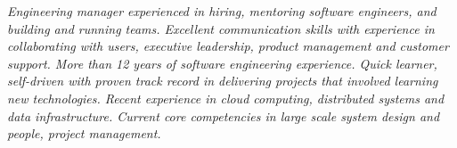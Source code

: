 {\selectfont
\begin{justify}\textit{Engineering manager experienced in hiring, mentoring software engineers, and building and running teams. Excellent communication skills with experience in collaborating with users, executive leadership, product management and customer support. More than 12 years of software engineering experience. Quick learner, self-driven with proven track record in delivering projects that involved learning new technologies. Recent experience in cloud computing, distributed systems and data infrastructure. Current core competencies in large scale system design and people, project management.}\end{justify}
}